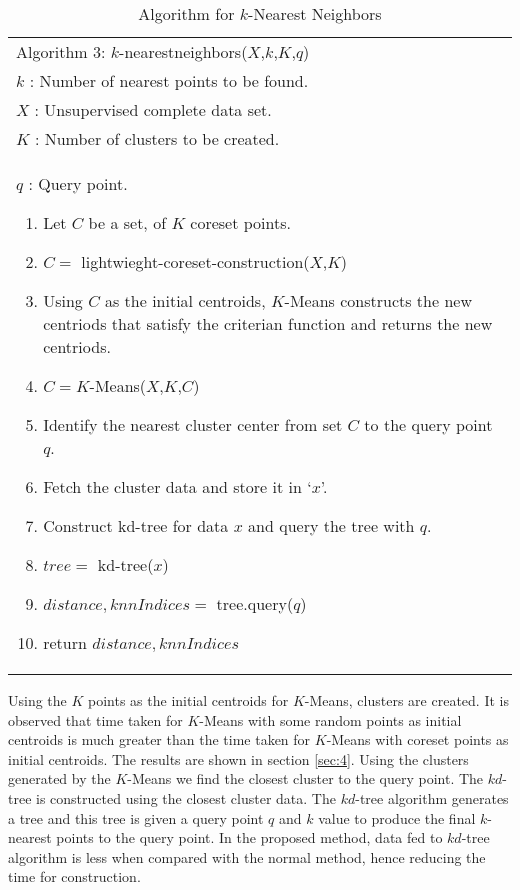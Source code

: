 \documentclass[runningheads]{llncs}
\begin{document}
\begin{table}[!hbt]
	\caption{Algorithm for $k$-Nearest Neighbors}
	\label{tab:3}   
	\begin{tabular}{p{11cm}}
		\hline\noalign{\smallskip}
		Algorithm 3: $k$-nearestneighbors($X$,$k$,$K$,$q$)\\
		\noalign{\smallskip}\hline
		$k$ : Number of nearest points to be found.\\
		$X$ : Unsupervised complete data set.\\
		$K$ : Number of clusters to be created.\\
		$q$ : Query point.
		\begin{enumerate}
			\item{Let $C$ be a set, of $K$ coreset points.}
			\item[]{$C =$ lightwieght-coreset-construction($X$,$K$)}
			\item{Using $C$ as the initial centroids, $K$-Means constructs the new centriods that satisfy the criterian function and returns the new centriods.}
			\item[]{$C=K$-Means($X$,$K$,$C$)}
			\item{Identify the nearest cluster center from set $C$ to the query point $q$.}
			\item{Fetch the cluster data and store it in `$x$'.}
			\item{Construct kd-tree for data $x$ and query the tree with $q$.}
			\item[]{$tree = $ kd-tree($x$) }
			\item[]{$distance,knnIndices = $ tree.query($q$) }
			\item{return $distance,knnIndices$}			
		\end{enumerate} \\
		\hline
	\end{tabular}
\end{table}
Using the $K$ points as the initial centroids for $K$-Means, clusters are created. It is observed that time taken for $K$-Means with some random points as initial centroids is much greater than the time taken for $K$-Means with coreset points as initial centroids. The results are shown in section \ref{sec:4}.
Using the clusters generated by the $K$-Means we find the closest cluster to the query point. The $kd$-tree is constructed using the closest cluster data. The $kd$-tree algorithm generates a tree and this tree is given a query point $q$ and $k$ value to produce the final $k$-nearest points to the query point. In the proposed method, data fed to $kd$-tree algorithm is less when compared with the normal method, hence reducing the time for construction. 
\end{document}
